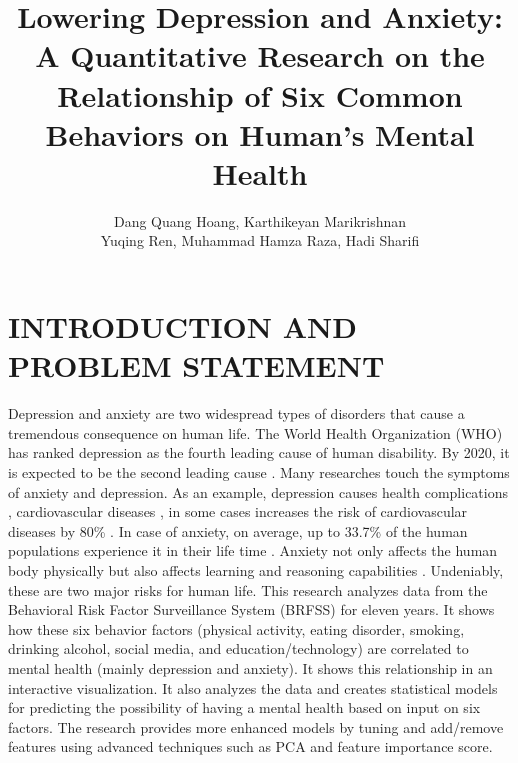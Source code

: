\documentclass[letterpaper, 10 pt, conference]{ieeeconf}  %
\title{\LARGE \bf
Lowering Depression and Anxiety: A Quantitative Research on the Relationship of Six Common Behaviors 
on Human's Mental Health
}
\author{Dang Quang Hoang, Karthikeyan Marikrishnan \\ Yuqing Ren, Muhammad Hamza Raza, Hadi Sharifi}
\begin{document}
\maketitle
\thispagestyle{empty}
\pagestyle{empty}






\section{INTRODUCTION AND PROBLEM STATEMENT}
Depression and anxiety are two widespread types of disorders that cause a tremendous consequence on human life.  
The World Health Organization (WHO) has ranked depression as the fourth leading cause of human disability.
By 2020, it is expected to be the second leading cause \cite{kessler2013epidemiology}. Many researches touch the symptoms of anxiety and depression.
As an example, depression causes health 
complications \cite{verma2017impact}, cardiovascular diseases \cite{bradley2015depression}, in some cases increases 
the risk of cardiovascular diseases by 80\% \cite{penninx2017depression}. In case of anxiety, on average, up to 33.7\% of 
the human populations experience it in their life time \cite{bandelow2015epidemiology}. Anxiety not only affects the human body physically
but also affects learning and reasoning capabilities \cite{spielberger2013effects}\cite{darke1988effects}. 
Undeniably, these are two major risks for human life.
This research analyzes data from the Behavioral Risk Factor Surveillance System (BRFSS)\cite{brfss} for eleven years. 
It shows how these six behavior factors (physical activity, eating disorder, 
smoking, drinking alcohol, social media, and education/technology) are correlated to mental health (mainly depression and anxiety). It shows
this relationship in an interactive visualization. It also analyzes the data and creates statistical models for predicting the possibility of 
having a mental health based on input on six factors. The research provides more enhanced models by tuning and add/remove features using
advanced techniques such as PCA and feature importance score. 
 
\end{document}
